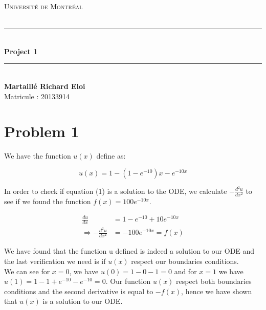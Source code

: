 \documentclass[11pt,letterpaper]{article}
\begin{document}
\begin{titlepage}
\center

\vspace*{2cm}

\textsc{\LARGE Université de Montréal}\\[1cm] 
\textsc{\Large }\\[1.5cm] 

\rule{\linewidth}{0.5mm} \\[0.5cm]
{\LARGE \bfseries Project 1} \\[0.2cm] %
\rule{\linewidth}{0.5mm} \\[5cm]

\textbf{\Large  Martaillé Richard Eloi}\\

{\Large Matricule : 20133914}\\[8cm] 

\end{titlepage}




\section{Problem 1}

We have the function $u(x)$ define as:

\begin{equation}
    u(x) = 1 - (1 - e^{-10})x - e^{-10x}
\end{equation}

In order to check if equation (1) is a solution to the ODE, we calculate $-\frac{d^2u}{dx^2}$ to see if we found the function $f(x)=100e^{-10x}$.

\begin{align*}
    \frac{du}{dx} &= 1 - e^{-10} +10 e^{-10x} \\
    \Longrightarrow -\frac{d^2u}{dx^2} &= -100e^{-10x} = f(x)
\end{align*}

We have found that the function u defined is indeed a solution to our ODE and the last verification we need is if $u(x)$ respect our boundaries conditions. \\

We can see for $x=0$, we have $u(0)= 1 - 0 -1 =0$ and for $x=1$ we have $u(1) = 1 - 1 + e^{-10} - e^{-10} = 0$. Our function $u(x)$ respect both boundaries conditions and the second derivative is equal to $-f(x)$, hence we have shown that $u(x)$ is a solution to our ODE.
\end{document}
